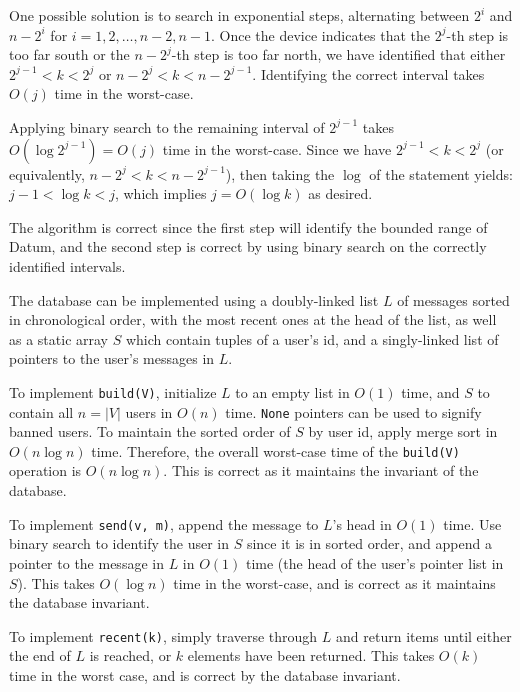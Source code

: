 \documentclass[12pt,twoside]{article}
\begin{document}
\begin{problems}
\begin{problemparts}
\end{problemparts}

\newpage
\problem  %
One possible solution is to search in exponential steps, alternating between \(2^i\) and \(n-2^i\) for \(i=1,2,\ldots,n-2,n-1\). Once the device indicates that the \(2^j\)-th step is too far south or the \(n-2^j\)-th step is too far north, we have identified that either \(2^{j-1}<k<2^j\) or \(n-2^j<k<n-2^{j-1}\). Identifying the correct interval takes \(O(j)\) time in the worst-case.

Applying binary search to the remaining interval of \(2^{j-1}\) takes \(O(\log 2^{j-1})=O(j)\) time in the worst-case. Since we have \(2^{j-1}<k<2^j\) (or equivalently, \(n-2^j<k<n-2^{j-1}\)), then taking the \(\log\) of the statement yields: \(j-1<\log k<j\), which implies \(j=O(\log k)\) as desired.

The algorithm is correct since the first step will identify the bounded range of Datum, and the second step is correct by using binary search on the correctly identified intervals.

\newpage
\problem  %
The database can be implemented using a doubly-linked list \(L\) of messages sorted in chronological order, with the most recent ones at the head of the list, as well as a static array \(S\) which contain tuples of a user's id, and a singly-linked list of pointers to the user's messages in \(L\).

To implement \verb|build(V)|, initialize \(L\) to an empty list in \(O(1)\) time, and \(S\) to contain all \(n=|V|\) users in \(O(n)\) time. \verb|None| pointers can be used to signify banned users. To maintain the sorted order of \(S\) by user id, apply merge sort in \(O(n \log n)\) time. Therefore, the overall worst-case time of the \verb|build(V)| operation is \(O(n\log n)\). This is correct as it maintains the invariant of the database.

To implement \verb|send(v, m)|, append the message to \(L\)'s head in \(O(1)\) time. Use binary search to identify the user in \(S\) since it is in sorted order, and append a pointer to the message in \(L\) in \(O(1)\) time (the head of the user's pointer list in \(S\)). This takes \(O(\log n)\) time in the worst-case, and is correct as it maintains the database invariant.

To implement \verb|recent(k)|, simply traverse through \(L\) and return items until either the end of \(L\) is reached, or \(k\) elements have been returned. This takes \(O(k)\) time in the worst case, and is correct by the database invariant.


\end{problems}
\end{document}
